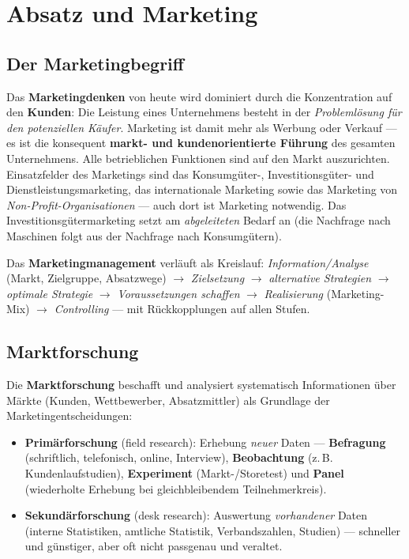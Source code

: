 \documentclass[11pt, a4paper]{article}
\begin{document}
\section{Absatz und Marketing}

\subsection{Der Marketingbegriff}

Das \textbf{Marketingdenken} von heute wird dominiert durch die Konzentration auf den
\textbf{Kunden}: Die Leistung eines Unternehmens besteht in der \emph{Problemlösung für
den potenziellen Käufer}. Marketing ist damit mehr als Werbung oder Verkauf --- es ist
die konsequent \textbf{markt- und kundenorientierte Führung} des gesamten Unternehmens.
Alle betrieblichen Funktionen sind auf den Markt auszurichten. Einsatzfelder des
Marketings sind das Konsumgüter-, Investitionsgüter- und Dienstleistungsmarketing, das
internationale Marketing sowie das Marketing von \emph{Non-Profit-Organisationen} ---
auch dort ist Marketing notwendig. Das Investitionsgütermarketing setzt am
\emph{abgeleiteten} Bedarf an (die Nachfrage nach Maschinen folgt aus der Nachfrage nach
Konsumgütern).

Das \textbf{Marketingmanagement} verläuft als Kreislauf: \emph{Information/Analyse}
(Markt, Zielgruppe, Absatzwege) $\rightarrow$ \emph{Zielsetzung} $\rightarrow$
\emph{alternative Strategien} $\rightarrow$ \emph{optimale Strategie} $\rightarrow$
\emph{Voraussetzungen schaffen} $\rightarrow$ \emph{Realisierung} (Marketing-Mix)
$\rightarrow$ \emph{Controlling} --- mit Rückkopplungen auf allen Stufen.

\subsection{Marktforschung}

Die \textbf{Marktforschung} beschafft und analysiert systematisch Informationen über
Märkte (Kunden, Wettbewerber, Absatzmittler) als Grundlage der Marketingentscheidungen:

\begin{itemize}
  \item \textbf{Primärforschung} (field research): Erhebung \emph{neuer} Daten ---
    \textbf{Befragung} (schriftlich, telefonisch, online, Interview),
    \textbf{Beobachtung} (z.\,B. Kundenlaufstudien), \textbf{Experiment} (Markt-/Storetest)
    und \textbf{Panel} (wiederholte Erhebung bei gleichbleibendem Teilnehmerkreis).
  \item \textbf{Sekundärforschung} (desk research): Auswertung \emph{vorhandener} Daten
    (interne Statistiken, amtliche Statistik, Verbandszahlen, Studien) --- schneller und
    günstiger, aber oft nicht passgenau und veraltet.
\end{itemize}
\end{document}
